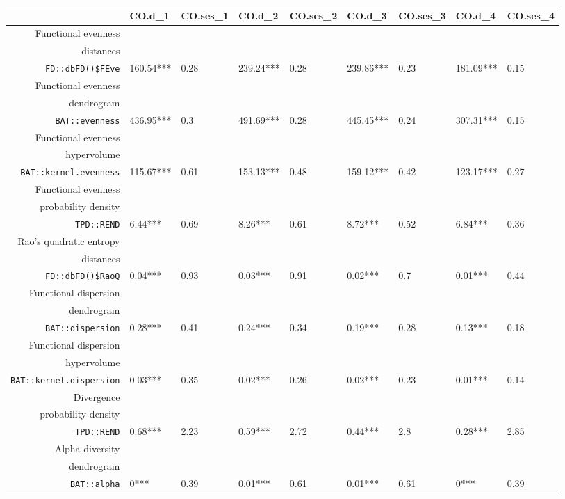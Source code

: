 \begin{table}[ht]
\scriptsize
\centering
\begin{tabular}{rllllllll}
  \hline
 & CO.d\_1 & CO.ses\_1 & CO.d\_2 & CO.ses\_2 & CO.d\_3 & CO.ses\_3 & CO.d\_4 & CO.ses\_4 \\ 
  \hline
Functional evenness\\distances\\\texttt{FD::dbFD()\$FEve} & 160.54*** & 0.28 & 239.24*** & 0.28 & 239.86*** & 0.23 & 181.09*** & 0.15 \\ 
  Functional evenness\\dendrogram\\\texttt{BAT::evenness} & 436.95*** & 0.3 & 491.69*** & 0.28 & 445.45*** & 0.24 & 307.31*** & 0.15 \\ 
  Functional evenness\\hypervolume\\\texttt{BAT::kernel.evenness} & 115.67*** & 0.61 & 153.13*** & 0.48 & 159.12*** & 0.42 & 123.17*** & 0.27 \\ 
  Functional evenness\\probability density\\\texttt{TPD::REND} & 6.44*** & 0.69 & 8.26*** & 0.61 & 8.72*** & 0.52 & 6.84*** & 0.36 \\ 
  Rao's quadratic entropy\\distances\\\texttt{FD::dbFD()\$RaoQ} & 0.04*** & 0.93 & 0.03*** & 0.91 & 0.02*** & 0.7 & 0.01*** & 0.44 \\ 
  Functional dispersion\\dendrogram\\\texttt{BAT::dispersion} & 0.28*** & 0.41 & 0.24*** & 0.34 & 0.19*** & 0.28 & 0.13*** & 0.18 \\ 
  Functional dispersion\\hypervolume\\\texttt{BAT::kernel.dispersion} & 0.03*** & 0.35 & 0.02*** & 0.26 & 0.02*** & 0.23 & 0.01*** & 0.14 \\ 
  Divergence\\probability density\\\texttt{TPD::REND} & 0.68*** & 2.23 & 0.59*** & 2.72 & 0.44*** & 2.8 & 0.28*** & 2.85 \\ 
  Alpha diversity\\dendrogram\\\texttt{BAT::alpha} & 0*** & 0.39 & 0.01*** & 0.61 & 0.01*** & 0.61 & 0*** & 0.39 \\ 

\end{tabular}
\end{table}
